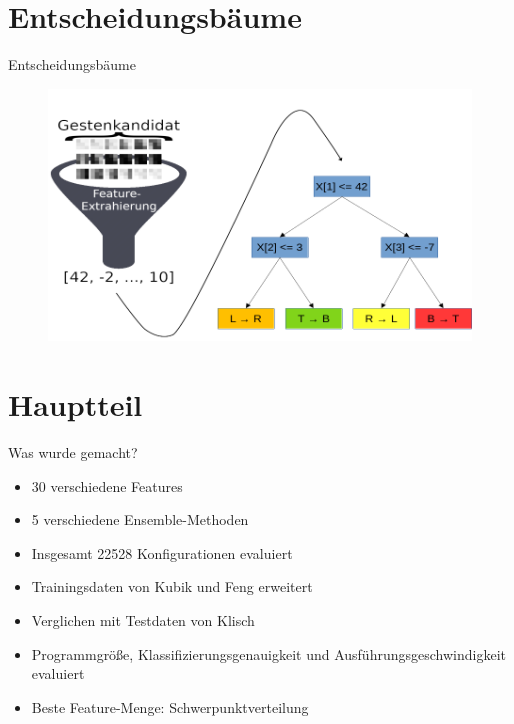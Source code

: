 \documentclass[10pt]{beamer}
\begin{document}
\section{Entscheidungsbäume}
\begin{frame}{Entscheidungsbäume}
\begin{figure}
    \centering
    \includegraphics[width=\linewidth]{process_draw.png}
\end{figure}
\end{frame}

\section{Hauptteil}
\begin{frame}{Was wurde gemacht?}
\begin{itemize}
    \item 30 verschiedene Features
    \item 5 verschiedene Ensemble-Methoden
    \item Insgesamt 22528 Konfigurationen evaluiert
    \item Trainingsdaten von Kubik und Feng erweitert
    \item Verglichen mit Testdaten von Klisch
    \item Programmgröße, Klassifizierungsgenauigkeit und Ausführungsgeschwindigkeit evaluiert
    \item Beste Feature-Menge: Schwerpunktverteilung
\end{itemize}
\end{frame}
\end{document}
